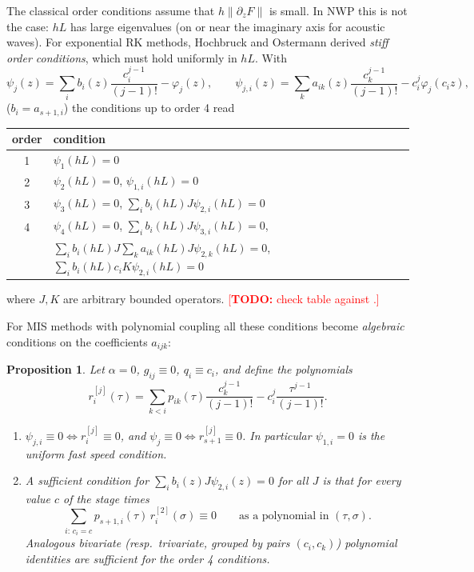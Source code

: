 \documentclass[11pt,a4paper]{article}
\newtheorem{proposition}[theorem]{Proposition}
\theoremstyle{definition}
\theoremstyle{remark}
\newcommand{\todo}[1]{\textcolor{red}{[\textbf{TODO:} #1]}}
\begin{document}
The classical order conditions assume that $h\|\partial_zF\|$ is small.
In NWP this is not the case: $hL$ has large eigenvalues (on or near the
imaginary axis for acoustic waves). For exponential RK methods,
Hochbruck and Ostermann \cite{HochbruckOstermann2005,HochbruckOstermann2010}
derived \emph{stiff order conditions}, which must hold uniformly in $hL$.
With
\begin{equation*}
 \psi_j(z)=\sum_ib_i(z)\frac{c_i^{j-1}}{(j-1)!}-\varphi_j(z),\qquad
 \psi_{j,i}(z)=\sum_ka_{ik}(z)\frac{c_k^{j-1}}{(j-1)!}-c_i^j\varphi_j(c_iz),
\end{equation*}
($b_i=a_{s+1,i}$) the conditions up to order 4 read
\begin{center}
\begin{tabular}{cl}
\toprule
order & condition\\\midrule
1 & $\psi_1(hL)=0$\\
2 & $\psi_2(hL)=0$, \quad $\psi_{1,i}(hL)=0$\\
3 & $\psi_3(hL)=0$, \quad $\sum_ib_i(hL)J\psi_{2,i}(hL)=0$\\
4 & $\psi_4(hL)=0$, \quad $\sum_ib_i(hL)J\psi_{3,i}(hL)=0$,\\
  & $\sum_ib_i(hL)J\sum_ka_{ik}(hL)J\psi_{2,k}(hL)=0$, \quad
    $\sum_ib_i(hL)c_iK\psi_{2,i}(hL)=0$\\
\bottomrule
\end{tabular}
\end{center}
where $J,K$ are arbitrary bounded operators. \todo{check table against
\cite{HochbruckOstermann2005}.}

For MIS methods with polynomial coupling all these conditions become
\emph{algebraic} conditions on the coefficients $a_{ijk}$:

\begin{proposition}\label{prop:stiff}
Let $\alpha=0$, $g_{ij}\equiv0$, $q_i\equiv c_i$, and define the polynomials
\begin{equation*}
 r_i^{[j]}(\tau)=\sum_{k<i}p_{ik}(\tau)\frac{c_k^{j-1}}{(j-1)!}
   -c_i^j\frac{\tau^{j-1}}{(j-1)!} .
\end{equation*}
\begin{enumerate}[label=(\alph*)]
\item $\psi_{j,i}\equiv0 \iff r_i^{[j]}\equiv0$, and
  $\psi_j\equiv0\iff r_{s+1}^{[j]}\equiv0$. In particular $\psi_{1,i}=0$
  is the uniform fast speed condition.
\item A sufficient condition for $\sum_ib_i(z)J\psi_{2,i}(z)=0$ for all
  $J$ is that for every value $c$ of the stage times
  \begin{equation*}
   \sum_{i:\,c_i=c}p_{s+1,i}(\tau)\,r_i^{[2]}(\sigma)\equiv0
   \qquad\text{as a polynomial in }(\tau,\sigma).
  \end{equation*}
  Analogous bivariate (resp.\ trivariate, grouped by pairs
  $(c_i,c_k)$) polynomial identities are sufficient for the order 4
  conditions.
\end{enumerate}
\end{proposition}
\end{document}
